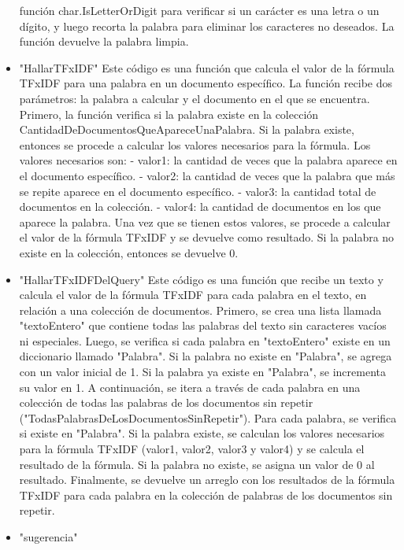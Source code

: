 \documentclass{article}
\begin{document}
\begin{itemize}
    función char.IsLetterOrDigit para verificar si un carácter es una letra o un dígito, 
    y luego recorta la palabra para eliminar los caracteres no deseados. La función 
    devuelve la palabra limpia.
    \item "HallarTFxIDF" 
    Este código es una función que calcula el valor de la fórmula TFxIDF para una 
    palabra en un documento específico. La función recibe dos parámetros: la 
    palabra a calcular y el documento en el que se encuentra. 
    Primero, la función verifica si la palabra existe en la colección 
    CantidadDeDocumentosQueApareceUnaPalabra. Si la palabra existe, entonces 
    se procede a calcular los valores necesarios para la fórmula. 
    Los valores necesarios son: 
    - valor1: la cantidad de veces que la palabra aparece en el documento 
    específico. 
    - valor2: la cantidad de veces que la palabra que más se repite aparece en el 
    documento específico. 
    - valor3: la cantidad total de documentos en la colección. 
    - valor4: la cantidad de documentos en los que aparece la palabra. 
    Una vez que se tienen estos valores, se procede a calcular el valor de la 
    fórmula TFxIDF y se devuelve como resultado. Si la palabra no existe en la 
    colección, entonces se devuelve 0. 
    \item "HallarTFxIDFDelQuery" 
    Este código es una función que recibe un texto y calcula el valor de la fórmula 
    TFxIDF para cada palabra en el texto, en relación a una colección de 
    documentos. 
    Primero, se crea una lista llamada "textoEntero" que contiene todas las 
    palabras del texto sin caracteres vacíos ni especiales. Luego, se verifica si 
    cada palabra en "textoEntero" existe en un diccionario llamado "Palabra". Si la 
    palabra no existe en "Palabra", se agrega con un valor inicial de 1. Si la palabra 
    ya existe en "Palabra", se incrementa su valor en 1. 
    A continuación, se itera a través de cada palabra en una colección de todas las 
    palabras de los documentos sin repetir 
    ("TodasPalabrasDeLosDocumentosSinRepetir"). Para cada palabra, se verifica 
    si existe en "Palabra". Si la palabra existe, se calculan los valores necesarios 
    para la fórmula TFxIDF (valor1, valor2, valor3 y valor4) y se calcula el resultado 
    de la fórmula. Si la palabra no existe, se asigna un valor de 0 al resultado. 
    Finalmente, se devuelve un arreglo con los resultados de la fórmula TFxIDF 
    para cada palabra en la colección de palabras de los documentos sin repetir.
    \item "sugerencia" 

\end{itemize}
\end{document}
